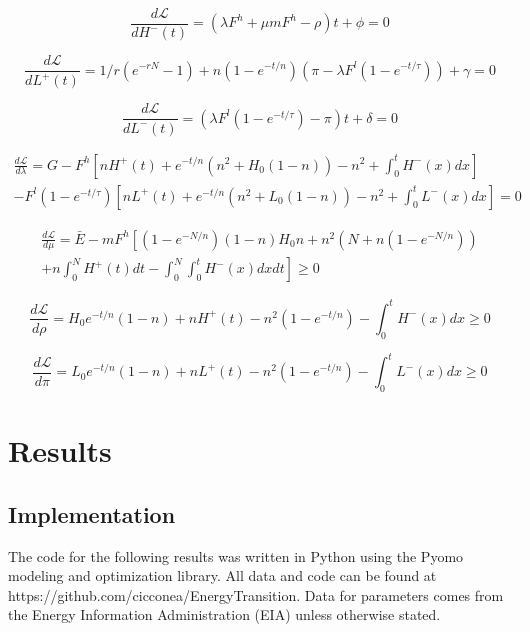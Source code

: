 \documentclass{article}
\newcommand{\Lagr}{\mathcal{L}}
\begin{document}
\begin{equation}\label{eq:dLdH-}
\frac{d\Lagr}{dH^-(t)} = (\lambda F^h +\mu m F^h - \rho)t + \phi = 0
\end{equation}

\begin{equation}\label{eq:dLdL+}
\frac{d\Lagr}{dL^+(t)} = 1/r(e^{-rN} -1) + n(1-e^{-t/n})(\pi - \lambda F^l(1-e^{-t/\tau})) + \gamma = 0
\end{equation}

\begin{equation}\label{eq:dLdL-}
\frac{d\Lagr}{dL^-(t)} = (\lambda F^l(1-e^{-t/\tau}) - \pi)t + \delta = 0
\end{equation}

\begin{multline}\label{eq:dLdlambda}
\frac{d\Lagr}{d\lambda} = G - F^h\left[nH^+(t) + e^{-t/n}(n^2 + H_0(1-n)) - n^2 + \int_0^tH^-(x)dx\right] \\ - F^l (1-e^{-t/\tau})\left[nL^+(t) + e^{-t/n}(n^2 + L_0(1-n)) - n^2 + \int_0^tL^-(x)dx\right] = 0
\end{multline}

\begin{multline}\label{eq:dLdmu}
\frac{d\Lagr}{d\mu} = \bar{E} - mF^h \left [(1-e^{-N/n})(1-n)H_0 n + n^2(N + n(1-e^{-N/n})) \right.\\ + \left. n\int_0^N H^+(t) dt - \int_0^N\int_0^t H^-(x)dx dt   \right] \geq 0
\end{multline}

\begin{equation}\label{eq:dLdrho}
\frac{d\Lagr}{d\rho} = H_0 e^{-t/n}(1-n) + nH^+(t) - n^2(1-e^{-t/n}) - \int_0^t H^-(x)dx \geq 0 
\end{equation}

\begin{equation}\label{eq:dLdpi}
\frac{d\Lagr}{d\pi} = L_0 e^{-t/n}(1-n) + nL^+(t) - n^2(1-e^{-t/n}) - \int_0^t L^-(x)dx \geq 0 
\end{equation}





\section{Results}

\subsection{Implementation}
The code for the following results was written in Python using the Pyomo modeling and optimization library. All data and code can be found at \\ https://github.com/cicconea/EnergyTransition. Data for parameters comes from the Energy Information Administration (EIA) unless otherwise stated.  
\end{document}
